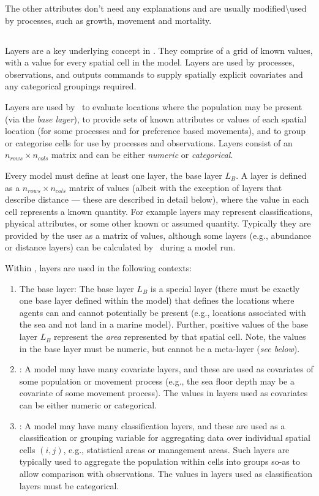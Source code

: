 The other attributes don't need any explanations and are usually modified\textbackslash used by processes, such as growth, movement and mortality.

\subsection{\label{sec:layers}}
Layers are a key underlying concept in \IBM. They comprise of a grid of known values, with a value for every spatial cell in the model. Layers are used by processes, observations, and outputs commands to supply spatially explicit covariates and any categorical groupings required. 

Layers are used by \IBM\ to evaluate locations where the population may be present (via the \emph{base layer}), to provide sets of known attributes or values of each spatial location (for some processes and for preference based movements), and to group or categorise cells for use by processes and observations. Layers consist of an $n_{rows} \times n_{cols}$ matrix and can be either \emph{numeric} or \emph{categorical}. 

Every model must define at least one layer, the base layer $L_B$. A layer is defined as a $n_{rows} \times n_{cols}$ matrix of values (albeit with the exception of layers that describe distance --- these are described in detail below), where the value in each cell represents a known quantity. For example layers may represent classifications, physical attributes, or some other known or assumed quantity. Typically they are provided by the user as a matrix of values, although some layers (e.g., abundance or distance layers) can be calculated by \IBM\ during a model run. 

Within \IBM, layers are used in the following contexts:
\begin{enumerate}
	\item The base layer: The base layer $L_B$ is a special layer (there must be exactly one base layer defined within the model) that defines the locations where agents can and cannot potentially be present (e.g., locations associated with the sea and not land in a marine model). Further, positive values of the base layer $L_B$ represent the \emph{area} represented by that spatial cell. Note, the values in the base layer must be numeric, but cannot be a meta-layer (\emph{see below}).
	\item {}: A model may have many covariate layers, and these are used as covariates of some population or movement process (e.g., the sea floor depth may be a covariate of some movement process). The values in layers used as covariates can be either numeric or categorical.
	\item {}: A model may have many classification layers, and these are used as a classification or grouping variable for aggregating data over individual spatial cells $(i,j)$, e.g., statistical areas or management areas. Such layers are typically used to aggregate the population within cells into groups so-as to allow comparison with observations. The values in layers used as classification layers must be categorical.
\end{enumerate}

